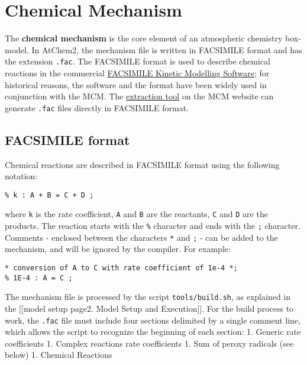\section{Chemical Mechanism} \label{sec:mechanism}

The \textbf{chemical mechanism} is the core element of an atmospheric
chemistry box-model. In AtChem2, the mechanism file is written in
FACSIMILE format and has the extension \texttt{.fac}. The FACSIMILE
format is used to describe chemical reactions in the commercial
\href{http://www.mcpa-software.com/}{FACSIMILE Kinetic Modelling
Software}; for historical reasons, the software and the format have been
widely used in conjunction with the MCM. The
\href{http://mcm.leeds.ac.uk/MCMv3.3.1/extract.htt}{extraction tool} on
the MCM website can generate \texttt{.fac} files directly in FACSIMILE
format.

\subsection{FACSIMILE format}\label{facsimile-format}

Chemical reactions are described in FACSIMILE format using the following
notation:

\begin{verbatim}
% k : A + B = C + D ;
\end{verbatim}

where \texttt{k} is the rate coefficient, \texttt{A} and \texttt{B} are
the reactants, \texttt{C} and \texttt{D} are the products. The reaction
starts with the \texttt{\%} character and ends with the \texttt{;}
character. Comments - enclosed between the characters \texttt{*} and
\texttt{;} - can be added to the mechanism, and will be ignored by the
compiler. For example:

\begin{verbatim}
* conversion of A to C with rate coefficient of 1e-4 *;
% 1E-4 : A = C ;
\end{verbatim}

The mechanism file is processed by the script \texttt{tools/build.sh},
as explained in the {[}{[}model setup page\textbar{}2. Model Setup and
Execution{]}{]}. For the build process to work, the \texttt{.fac} file
must include four sections delimited by a single comment line, which
allows the script to recognize the beginning of each section: 1. Generic
rate coefficients 1. Complex reactions rate coefficients 1. Sum of
peroxy radicals (see below) 1. Chemical Reactions

